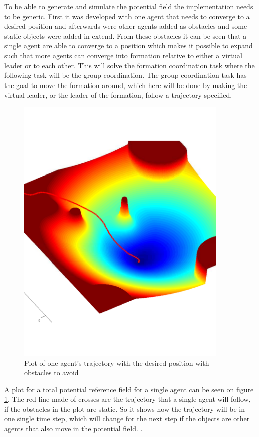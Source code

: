 To be able to generate and simulate the potential field the implementation needs to be generic. First it was developed with one agent that needs to converge to a desired position and afterwards were other agents added as obstacles and some static objects were added in extend. From these obstacles it can be seen that a single agent are able to converge to a position which makes it possible to expand such that more agents can converge into formation relative to either a virtual leader or to each other. This will solve the formation coordination task where the following task will be the group coordination. The group coordination task has the goal to move the formation around, which here will be done by making the virtual leader, or the leader of the formation, follow a trajectory specified.
\begin{figure}[htbp]
  \includegraphics[width=0.9\textwidth]{../../code/matlab/ftotmagnfig1}
  \caption{Plot of one agent's trajectory with the desired position with obstacles to avoid}
  \label{fig:potfieldagenti}
\end{figure}
A plot for a total potential reference field for a single agent can be seen on figure \ref{fig:potfieldagenti}. The red line made of crosses are the trajectory that a single agent will follow, if the obstacles in the plot are static. So it shows how the trajectory will be in one single time step, which will change for the next step if the objects are other agents that also move in the potential field. .\\



